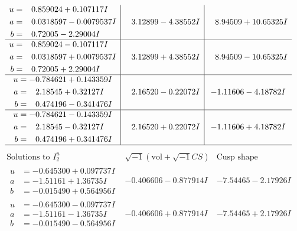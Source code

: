 \documentclass[1p]{elsarticle_modified}
\theoremstyle{definition}
\newcommand{\I}{\sqrt{-1}}
\begin{document}
$$\begin{array}{c|c|c}
\begin{aligned}
u &= \phantom{-}0.859024 + 0.107117 I \\
a &= \phantom{-}0.0318597 - 0.0079537 I \\
b &= \phantom{-}0.72005 - 2.29004 I\end{aligned}
 & \phantom{-}3.12899 - 4.38552 I & \phantom{-}8.94509 + 10.65325 I \\ \hline\begin{aligned}
u &= \phantom{-}0.859024 - 0.107117 I \\
a &= \phantom{-}0.0318597 + 0.0079537 I \\
b &= \phantom{-}0.72005 + 2.29004 I\end{aligned}
 & \phantom{-}3.12899 + 4.38552 I & \phantom{-}8.94509 - 10.65325 I \\ \hline\begin{aligned}
u &= -0.784621 + 0.143359 I \\
a &= \phantom{-}2.18545 + 0.32127 I \\
b &= \phantom{-}0.474196 - 0.341476 I\end{aligned}
 & \phantom{-}2.16520 - 0.22072 I & -1.11606 - 4.18782 I \\ \hline\begin{aligned}
u &= -0.784621 - 0.143359 I \\
a &= \phantom{-}2.18545 - 0.32127 I \\
b &= \phantom{-}0.474196 + 0.341476 I\end{aligned}
 & \phantom{-}2.16520 + 0.22072 I & -1.11606 + 4.18782 I\\
 \hline 
 \end{array}$$\newpage$$\begin{array}{c|c|c}  
\text{Solutions to }I^u_{2}& \I (\text{vol} + \sqrt{-1}CS) & \text{Cusp shape}\\
 \hline 
\begin{aligned}
u &= -0.645300 + 0.097737 I \\
a &= -1.51161 + 1.36735 I \\
b &= -0.015490 + 0.564956 I\end{aligned}
 & -0.406606 - 0.877914 I & -7.54465 - 2.17926 I \\ \hline\begin{aligned}
u &= -0.645300 - 0.097737 I \\
a &= -1.51161 - 1.36735 I \\
b &= -0.015490 - 0.564956 I\end{aligned}
 & -0.406606 + 0.877914 I & -7.54465 + 2.17926 I \\ \hline\begin{aligned}

\end{aligned}
\end{array}$$
\end{document}
